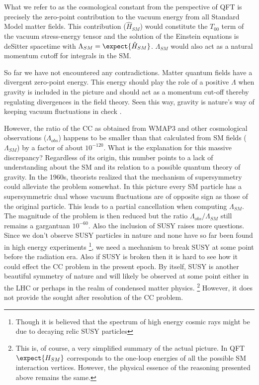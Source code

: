 \documentclass[11pt,english,rmp]{revtex4}
\begin{document}
What we refer to as the cosmological constant from the perspective
of QFT is precisely the zero-point contribution to the vacuum energy
from all Standard Model matter fields. This contribution ($\hat{H}_{SM}$)
would constitute the $T_{00}$ term of the vacuum stress-energy tensor
and the solution of the Einstein equations is deSitter spacetime with
$\Lambda_{SM}=\expect{\hat{H}_{SM}}$. $\Lambda_{SM}$ would also
act as a natural momentum cutoff for integrals in the SM.

So far we have not encountered any contradictions. Matter quantum
fields have a divergent zero-point energy. This energy should play
the role of a positive $\Lambda$ when gravity is included in the
picture and should act as a momentum cut-off thereby regulating divergences
in the field theory. Seen this way, gravity is nature's way of keeping
vacuum fluctuations in check \cite{Crane1985Space-time}.

However, the ratio of the CC as obtained from WMAP3 and other cosmological
observations ($\Lambda_{obs}$) happens to be smaller than that calculated
from SM fields ($\Lambda_{SM}$) by a factor of about $10^{-120}$.
What is the explanation for this massive discrepancy? Regardless of
its origin, this number points to a lack of understanding about the SM
and its relation to a possible quantum theory of gravity. In the 1960s, theorists realized
that the mechanism of supersymmetry could alleviate the problem somewhat.
In this picture every SM particle has a supersymmetric dual whose
vacuum fluctuations are of opposite sign as those of the original
particle. This leads to a partial cancellation when computing $\Lambda_{SM}$.
The magnitude of the problem is then reduced but the ratio $\Lambda_{obs}/\Lambda_{SM}$
still remains a gargantuan $10^{-60}$. Also the inclusion of SUSY
raises more questions. Since we don't observe SUSY particles in nature
and none have so far been found in high energy experiments%
\footnote{Though it is believed that the spectrum of high energy cosmic rays
might be due to decaying relic SUSY particles%
}, we need a mechanism to break SUSY at some point before the radiation
era. Also if SUSY is broken then it is hard to see how it could effect
the CC problem in the present epoch. By itself, SUSY is another beautiful
symmetry of nature and will likely be observed at some point either
in the LHC or perhaps in the realm of condensed matter physics.%
\footnote{This is, of course, a very simplified summary of the actual picture.
In QFT $\expect{H_{SM}}$ corresponds to the one-loop energies of
all the possible SM interaction vertices. However, the physical essence
of the reasoning presented above remains the same.%
} However, it does not provide the sought after resolution of the CC problem.
\end{document}
